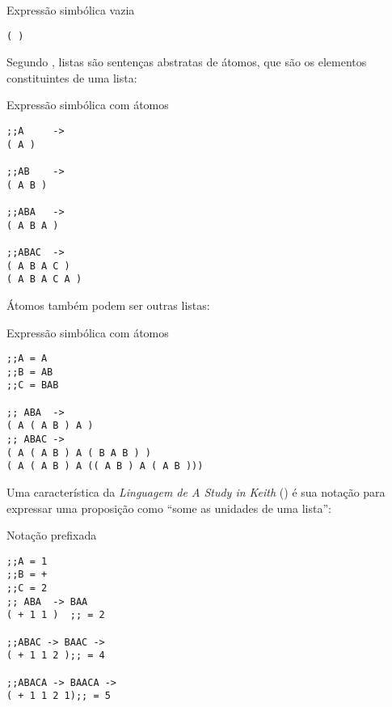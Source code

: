 \begin{example}{Expressão simbólica vazia}\label{ex:s-expression}
\begin{verbatim}
( )
\end{verbatim}
\end{example}

Segundo , listas são sentenças abstratas de átomos, que são os elementos constituintes de uma lista:

\begin{example}{Expressão simbólica com átomos}\label{ex:s-expression2}
\begin{verbatim}
;;A     -> 
( A )

;;AB    -> 
( A B )

;;ABA   ->
( A B A )

;;ABAC  ->
( A B A C )
( A B A C A )
\end{verbatim}
\end{example}

Átomos também podem ser outras listas:

\begin{example}{Expressão simbólica com átomos}\label{ex:s-expression3}
\begin{verbatim}
;;A = A
;;B = AB
;;C = BAB

;; ABA  -> 
( A ( A B ) A )
;; ABAC ->
( A ( A B ) A ( B A B ) )
( A ( A B ) A (( A B ) A ( A B )))
\end{verbatim}
\end{example}

Uma característica da \emph{Linguagem de A Study in Keith} () é sua notação para expressar uma proposição como  ``some as unidades de uma lista'':

\begin{example}{Notação prefixada}
\begin{verbatim}
;;A = 1
;;B = +
;;C = 2
;; ABA  -> BAA
( + 1 1 )  ;; = 2

;;ABAC -> BAAC -> 
( + 1 1 2 );; = 4

;;ABACA -> BAACA -> 
( + 1 1 2 1);; = 5
\end{verbatim}
\end{example}

